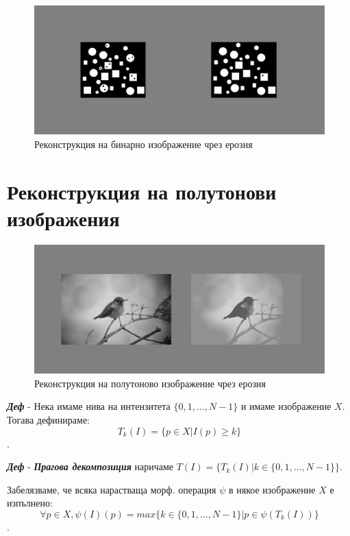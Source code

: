 \documentclass[fleqn,12pt]{article}
\begin{document}
\begin{figure}
    \centering
    \includegraphics[width=\textwidth]{img/er_rec.jpg}
    \caption{Реконструкция на бинарно изображение чрез ерозия}
    \label{fig:er_rec}
\end{figure}

\section{Реконструкция на полутонови изображения}

\begin{figure}
    \centering
    \includegraphics[width=\textwidth]{img/grayscale_rec.jpg}
    \caption{Реконструкция на полутоново изображение чрез ерозия}
    \label{fig:g_er_rec}
\end{figure}

\textbf{\textit{Деф}} - Нека имаме нива на интензитета $\{0, 1, \dots, N-1\}$ и имаме изображение $X$. Тогава дефинираме:
$$T_k(I) = \{p \in X | I(p) \geq k\}$$.

\bigbreak

\textbf{\textit{Деф}} - \textit{\textbf{Прагова декомпозиция}} наричаме $T(I) = \{T_k(I) | k \in \{0, 1, \dots, N-1\}\}$.

\bigbreak

Забелязваме, че всяка нарастваща морф. операция $\psi$ в някое изображение $X$ е изпълнено:
$$\forall p \in X, \psi(I)(p) = max\{k \in \{0, 1, \dots, N-1\} | p \in \psi(T_k(I))\}$$.
\end{document}
